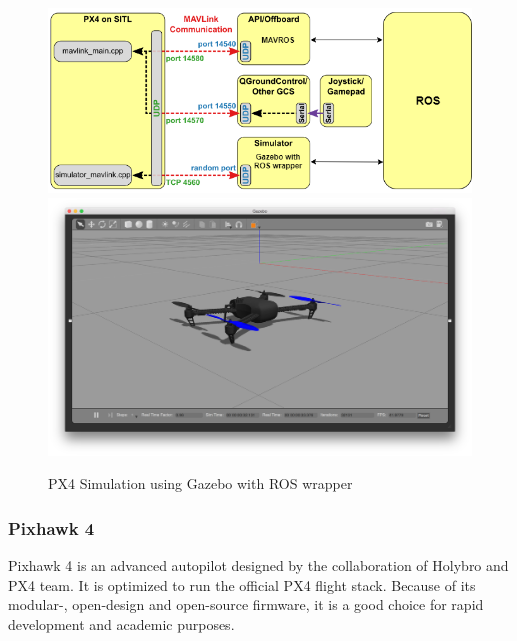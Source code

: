 \begin{figure}[h]
    \centering
    \includegraphics[width=120mm, keepaspectratio]{figures/px4_sitl_with_ros.png}
    \includegraphics[width=140mm]{figures/iris_gazebo.png}
    \caption{PX4 Simulation using Gazebo with ROS wrapper}
    \label{fig:px4_sitl_ros_wrapper}
\end{figure}

\subsubsection{Pixhawk 4}
Pixhawk 4 is an advanced autopilot designed by the collaboration of Holybro and PX4 team. It is optimized
to run the official PX4 flight stack. Because of its modular-, open-design and open-source firmware, it is 
a good choice for rapid development and academic purposes.

